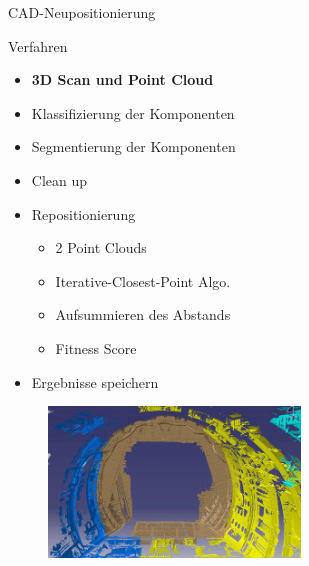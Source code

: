 \begin{frame}{CAD-Neupositionierung}
    \begin{minipage}[m]{0.49\textwidth}
    \begin{block}{Verfahren}
        \begin{itemize}
            \item \textbf{3D Scan und Point Cloud}
            \item Klassifizierung der Komponenten
            \item Segmentierung der Komponenten
            \item Clean up
            \item Repositionierung
            \begin{itemize}
                \item 2 Point Clouds
                \item Iterative-Closest-Point Algo.
                \item Aufsummieren des Abstands
                \item Fitness Score
            \end{itemize}
            \item Ergebnisse speichern
        \end{itemize}
    \end{block}
    \end{minipage}
    \begin{minipage}[m]{0.49\textwidth}
      \begin{figure}
          \includegraphics[width=190pt]{img_niklas/ImageForArticle_11471(1).jpg}
          \label{fig:my_label}
      \end{figure}
    \end{minipage}
\end{frame}

